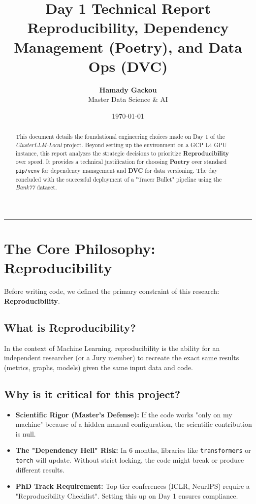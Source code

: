 \documentclass[11pt, a4paper]{article}
\title{\textbf{\Huge Day 1 Technical Report}\\ \Large Reproducibility, Dependency Management (Poetry), and Data Ops (DVC)}
\author{\textbf{Hamady Gackou} \\ Master Data Science \& AI}
\date{\today}
\begin{document}
\maketitle
\thispagestyle{empty}

\begin{abstract}
    This document details the foundational engineering choices made on Day 1 of the \textit{ClusterLLM-Local} project. Beyond setting up the environment on a GCP L4 GPU instance, this report analyzes the strategic decisions to prioritize \textbf{Reproducibility} over speed. It provides a technical justification for choosing \textbf{Poetry} over standard \texttt{pip/venv} for dependency management and \textbf{DVC} for data versioning. The day concluded with the successful deployment of a "Tracer Bullet" pipeline using the \textit{Bank77} dataset.
\end{abstract}

\tableofcontents
\vspace{1cm}
\hrule
\vspace{1cm}

\section{The Core Philosophy: Reproducibility}

Before writing code, we defined the primary constraint of this research: \textbf{Reproducibility}.

\subsection{What is Reproducibility?}
In the context of Machine Learning, reproducibility is the ability for an independent researcher (or a Jury member) to recreate the exact same results (metrics, graphs, models) given the same input data and code. 

\subsection{Why is it critical for this project?}
\begin{itemize}
    \item \textbf{Scientific Rigor (Master's Defense):} If the code works "only on my machine" because of a hidden manual configuration, the scientific contribution is null.
    \item \textbf{The "Dependency Hell" Risk:} In 6 months, libraries like \texttt{transformers} or \texttt{torch} will update. Without strict locking, the code might break or produce different results.
    \item \textbf{PhD Track Requirement:} Top-tier conferences (ICLR, NeurIPS) require a "Reproducibility Checklist". Setting this up on Day 1 ensures compliance.
\end{itemize}
\end{document}

